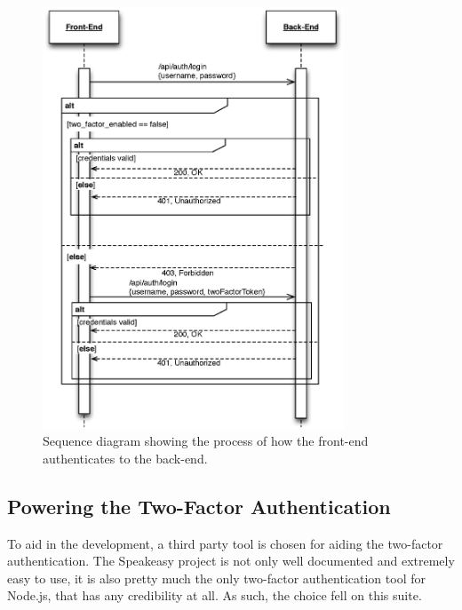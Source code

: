 		\begin{figure}[p]
			\centering
			\includegraphics[width=0.8\textwidth]{figures/implementation/uml/sequence/authentication.eps}
			\caption{Sequence diagram showing the process of how the front-end authenticates to the back-end.}
			\label{fig:sequence:auth}
		\end{figure}



		\subsection{Powering the Two-Factor Authentication}
			To aid in the development, a third party tool is chosen for aiding the two-factor authentication. The Speakeasy project\cite{speakeasy_lib} is not only well documented and extremely easy to use, it is also pretty much the only two-factor authentication tool for Node.js, that has any credibility at all. As such, the choice fell on this suite.

